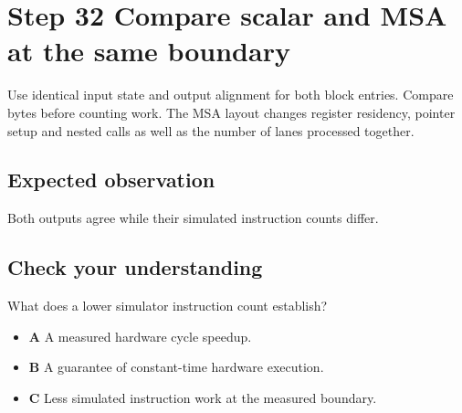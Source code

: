 \section{Step 32 Compare scalar and MSA at the same boundary}\label{chacha-s32}

Use identical input state and output alignment for both block entries. Compare bytes before counting work. The MSA layout changes register residency, pointer setup and nested calls as well as the number of lanes processed together.

\subsection{Expected observation}
Both outputs agree while their simulated instruction counts differ.

\subsection{Check your understanding}
What does a lower simulator instruction count establish?

\begin{itemize}
\item \textbf{A} A measured hardware cycle speedup.
\item \textbf{B} A guarantee of constant-time hardware execution.
\item \textbf{C} Less simulated instruction work at the measured boundary.
\end{itemize}
